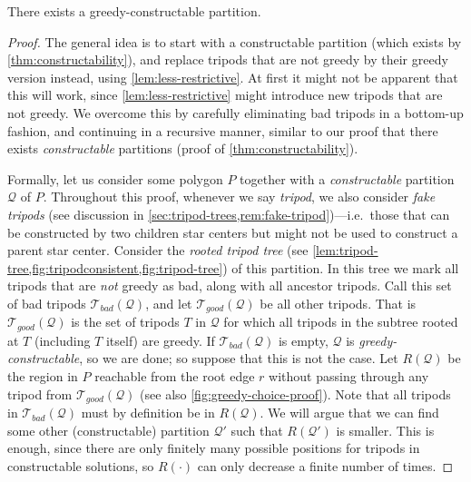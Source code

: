 \documentclass{theoretics}
\begin{document}
\begin{lemma}
\label{lem:greedy-constructable}
There exists a greedy-constructable partition. 
\end{lemma}

\begin{proof}
The general idea is to start with a constructable partition (which exists by \cref{thm:constructability}), and replace tripods that are not greedy by their greedy version instead, using \cref{lem:less-restrictive}.
At first it might not be apparent that this will work, since \cref{lem:less-restrictive} might introduce new tripods that are not greedy. We overcome this by carefully eliminating bad tripods in a bottom-up fashion, and continuing in a recursive manner, similar to our proof that there exists \emph{constructable} partitions (proof of \cref{thm:constructability}).

Formally, let us consider some polygon $P$ together with a \emph{constructable} partition $\mathcal{Q}$ of $P$. Throughout this proof, whenever we say \emph{tripod}, we also consider \emph{fake tripods} (see discussion in \cref{sec:tripod-trees,rem:fake-tripod})---i.e.\ those that can be constructed by two children star centers but might not be used to construct a parent star center.  Consider the \emph{rooted tripod tree} (see \cref{lem:tripod-tree,fig:tripodconsistent,fig:tripod-tree}) of this partition. In this tree we mark all tripods that are \emph{not} greedy as bad, along with all ancestor tripods. Call this set of bad tripods $\mathcal{T}_{bad}(\mathcal{Q})$, and let $\mathcal{T}_{good}(\mathcal{Q})$ be all other tripods. That is $\mathcal{T}_{good}(\mathcal{Q})$  is the set of tripods $T$ in $\mathcal{Q}$ for which all tripods in the subtree rooted at $T$ (including $T$ itself) are greedy. If $\mathcal{T}_{bad}(\mathcal{Q})$ is empty, $\mathcal{Q}$ is \emph{greedy-constructable}, so we are done; so suppose that this is not the case. Let $R(\mathcal{Q})$ be the region in $P$ reachable from the root edge $r$ without passing through any tripod from $\mathcal{T}_{good}(\mathcal{Q})$ (see also \cref{fig:greedy-choice-proof}). Note that all tripods in  $\mathcal{T}_{bad}(\mathcal{Q})$ must by definition be in $R(\mathcal{Q})$. We will argue that we can find some other (constructable) partition $\mathcal{Q}'$ such that $R(\mathcal{Q}')$ is smaller. This is enough, since there are only finitely many possible positions for tripods in constructable solutions, so $R(\cdot)$ can only decrease a finite number of times.



\end{proof}
\end{document}
